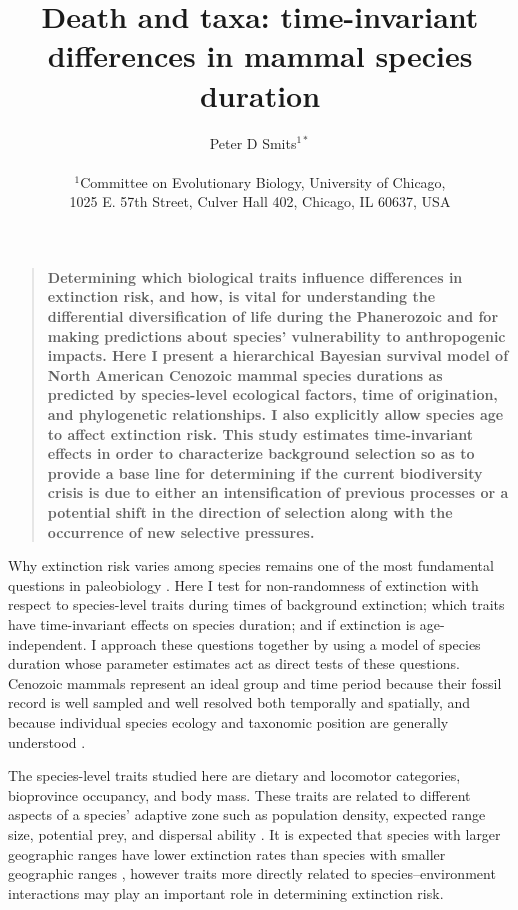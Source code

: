 \documentclass[12pt]{article}
\title{Death and taxa: time-invariant differences in mammal species duration}
\author
{Peter D Smits$^{1\ast}$\\
\\
\normalsize{$^{1}$Committee on Evolutionary Biology, University of Chicago,}\\
\normalsize{1025 E. 57th Street, Culver Hall 402, Chicago, IL 60637, USA}\\
}
\date{}
\newenvironment{sciabstract}{%
\begin{quote} \bf}
{\end{quote}}
\begin{document}
 


\baselineskip24pt


\maketitle 
\linenumbers
\modulolinenumbers[2]


\begin{sciabstract}
  Determining which biological traits influence differences in extinction risk, and how, is vital for understanding the differential diversification of life during the Phanerozoic and for making predictions about species' vulnerability to anthropogenic impacts. Here I present a hierarchical Bayesian survival model of North American Cenozoic mammal species durations as predicted by species-level ecological factors, time of origination, and phylogenetic relationships. I also explicitly allow species age to affect extinction risk. This study estimates time-invariant effects in order to characterize background selection so as to provide a base line for determining if the current biodiversity crisis is due to either an intensification of previous processes or a potential shift in the direction of selection along with the occurrence of new selective pressures.
\end{sciabstract}

Why extinction risk varies among species remains one of the most fundamental questions in paleobiology \cite{Simpson1944,VanValen1973,Raup1994,Quental2013,Wagner2014b}. Here I test for non-randomness of extinction with respect to species-level traits during times of background extinction; which traits have time-invariant effects on species duration; and if extinction is age-independent. I approach these questions together by using a model of species duration whose parameter estimates act as direct tests of these questions. Cenozoic mammals represent an ideal group and time period because their fossil record is well sampled and well resolved both temporally and spatially, and because individual species ecology and taxonomic position are generally understood \cite{Alroy2009,Liow2008,Smith2004,Quental2013,Simpson1944,Tomiya2013,Marcot2014}. 

The species-level traits studied here are dietary and locomotor categories, bioprovince occupancy, and body mass. These traits are related to different aspects of a species' adaptive zone such as population density, expected range size, potential prey, and dispersal ability \cite{Smith2004,Jernvall2004}. It is expected that species with larger geographic ranges have lower extinction rates than species with smaller geographic ranges \cite{Jablonski1986,Roy2009c}, however traits more directly related to species--environment interactions may play an important role in determining extinction risk. 
\end{document}
